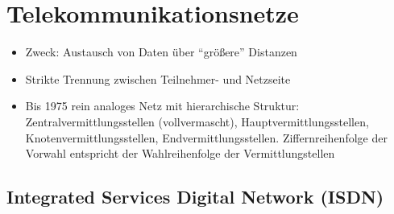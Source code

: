 \section{Telekommunikationsnetze}
\begin{itemize}
	\item Zweck: Austausch von Daten über "`größere"' Distanzen
	\item Strikte Trennung zwischen Teilnehmer- und Netzseite
	\item Bis 1975 rein analoges Netz mit hierarchische Struktur: Zentralvermittlungsstellen (vollvermascht), Hauptvermittlungsstellen, Knotenvermittlungsstellen, Endvermittlungsstellen. Ziffernreihenfolge der Vorwahl entspricht der Wahlreihenfolge der Vermittlungstellen
\end{itemize}

\subsection{Integrated Services Digital Network (ISDN)}

